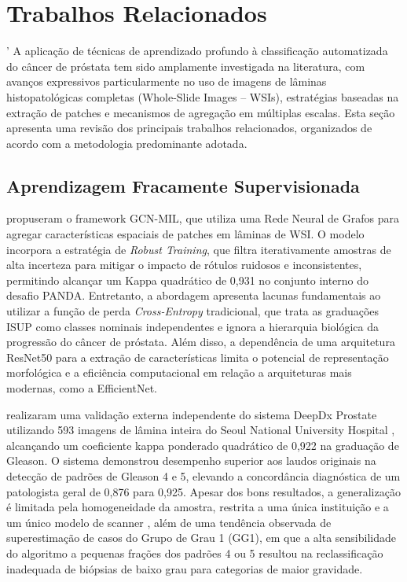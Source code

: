 \chapter{Trabalhos Relacionados}
\label{cap:trabalhos-relacionados}
'
A aplicação de técnicas de aprendizado profundo à classificação automatizada do câncer de próstata tem sido amplamente investigada na literatura, com avanços expressivos particularmente no uso de imagens de lâminas histopatológicas completas (Whole-Slide Images – WSIs), estratégias baseadas na extração de patches e mecanismos de agregação em múltiplas escalas. Esta seção apresenta uma revisão dos principais trabalhos relacionados, organizados de acordo com a metodologia predominante adotada.

\section{Aprendizagem Fracamente Supervisionada}
\cite{Xiang2023Prostate} propuseram o framework GCN-MIL, que utiliza uma Rede Neural de Grafos para agregar características espaciais de patches em lâminas de WSI. O modelo incorpora a estratégia de \textit{Robust Training}, que filtra iterativamente amostras de alta incerteza para mitigar o impacto de rótulos ruidosos e inconsistentes, permitindo alcançar um Kappa quadrático de 0,931 no conjunto interno do desafio PANDA. Entretanto, a abordagem apresenta lacunas fundamentais ao utilizar a função de perda \textit{Cross-Entropy} tradicional, que trata as graduações ISUP como classes nominais independentes e ignora a hierarquia biológica da progressão do câncer de próstata. Além disso, a dependência de uma arquitetura ResNet50 para a extração de características limita o potencial de representação morfológica e a eficiência computacional em relação a arquiteturas mais modernas, como a EfficientNet.

\cite{jung2022artificial} realizaram uma validação externa independente do sistema DeepDx Prostate utilizando 593 imagens de lâmina inteira do Seoul National University Hospital , alcançando um coeficiente kappa ponderado quadrático de 0,922 na graduação de Gleason. O sistema demonstrou desempenho superior aos laudos originais na detecção de padrões de Gleason 4 e 5, elevando a concordância diagnóstica de um patologista geral de 0,876 para 0,925. Apesar dos bons resultados, a generalização é limitada pela homogeneidade da amostra, restrita a uma única instituição e a um único modelo de scanner , além de uma tendência observada de superestimação de casos do Grupo de Grau 1 (GG1), em que a alta sensibilidade do algoritmo a pequenas frações dos padrões 4 ou 5 resultou na reclassificação inadequada de biópsias de baixo grau para categorias de maior gravidade.

